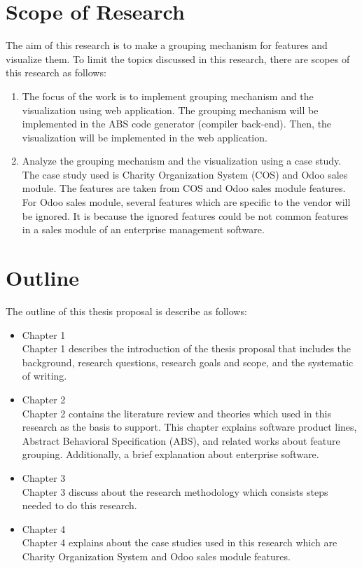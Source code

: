\section{Scope of Research}
The aim of this research is to make a grouping mechanism for features and visualize them. To limit the topics discussed in this research, there are scopes of this research as follows:
\begin{enumerate}
	\item The focus of the work is to implement grouping mechanism and the visualization using web application. The grouping mechanism will be implemented in the ABS code generator (compiler back-end). Then, the visualization will be implemented in the web application.
	\item Analyze the grouping mechanism and the visualization using a case study. The case study used is Charity Organization System (COS) and Odoo sales module. The features are taken from COS and Odoo sales module features. For Odoo sales module, several features which are specific to the vendor will be ignored. It is because the ignored features could be not common features in a sales module of an enterprise management software.
\end{enumerate}

\section{Outline}
The outline of this thesis proposal is describe as follows:
\begin{itemize}
	\item Chapter 1 \babSatu \\
	Chapter 1 describes the introduction of the thesis proposal that includes the background, research questions, research goals and scope, and the systematic of writing.
	\item Chapter 2 \babDua \\
	Chapter 2 contains the literature review and theories which used in this research as the basis to support. This chapter explains software product lines, Abstract Behavioral Specification (ABS), and related works about feature grouping. Additionally, a brief explanation about enterprise software.
	\item Chapter 3 \babTiga \\
	Chapter 3 discuss about the research methodology which consists steps needed to do this research.
	\item Chapter 4 \babEmpat \\
	Chapter 4 explains about the case studies used in this research which are Charity Organization System and Odoo sales module features.
\end{itemize}